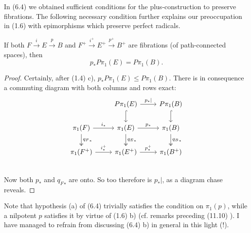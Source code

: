 In (6.4) we obtained sufficient conditions for the plus-construction to preserve fibrations.
The following necessary condition further explains our preoccupation in (1.6) with epimorphisms
which preserve perfect radicals.
\begin{prop}
	\label{6.8}If both $F\overset{i}{\longrightarrow} E\overset{p}{\longrightarrow} B$ and $F^+\overset{i^+}{\longrightarrow} E^+\overset{p^+}{\longrightarrow} B^+$ are fibrations (of path-connected spaces), then
\[p_*P\pi_1(E)=P\pi_1(B).\]
\end{prop}
\begin{proof}
 Certainly, after (1.4) c), $p_*P\pi_1(E)\leqslant P\pi_1(B)$. There is in consequence a commuting diagram with both columns and rows exact:
 \[
\begin{tikzcd}
  & P\pi_1(E) \arrow[r,"p_*|"] \arrow[d,hook] &  P\pi_1(B)\arrow[d,hook]  \\
 \pi_1(F) \arrow[r,"i_*"] \arrow[d,two heads,"{q_{F}}_*"] & \pi_1(E) \arrow[r,"p_*"]\arrow[d,two heads,"{q_{E}}_*"]  &  \pi_1(B) \arrow[d,two heads,"{q_{B}}_*"]  \\
 \pi_1(F^+) \arrow[r,"i_*^+"] & \pi_1(E^+) \arrow[r,"p_*^+"] &  \pi_1(B^+)  \\
\end{tikzcd}
 \]
Now both $p_*$ and ${q_F}_*$ are onto. So too therefore is $p_*|$, as a diagram chase reveals.
 \end{proof}
  
Note that hypothesis (a) of (6.4) trivially satisfies the condition on $\pi_1(p)$, while a nilpotent $p$ satisfies it by virtue of (1.6) b) (cf. remarks preceding (11.10) ). I have managed to refrain from discussing (6.4) b) in general in this light (!).



